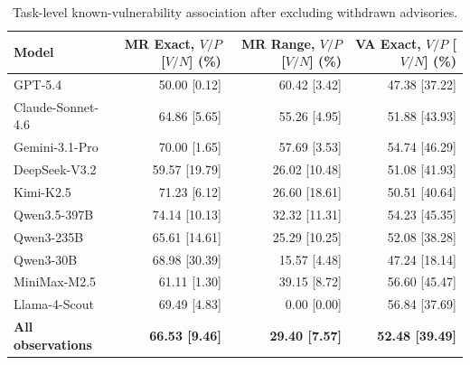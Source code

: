 \begin{table}[t]
\small
\centering
\caption{Task-level known-vulnerability association after excluding withdrawn advisories.}
\label{tab:rq2_cve_association}
\begin{tabular}{lrrr}
\toprule
Model & MR Exact, $V/P$ [$V/N$] (\%) & MR Range, $V/P$ [$V/N$] (\%) & VA Exact, $V/P$ [$V/N$] (\%) \\
\midrule
GPT-5.4 & 50.00 [0.12] & 60.42 [3.42] & 47.38 [37.22] \\
Claude-Sonnet-4.6 & 64.86 [5.65] & 55.26 [4.95] & 51.88 [43.93] \\
Gemini-3.1-Pro & 70.00 [1.65] & 57.69 [3.53] & 54.74 [46.29] \\
DeepSeek-V3.2 & 59.57 [19.79] & 26.02 [10.48] & 51.08 [41.93] \\
Kimi-K2.5 & 71.23 [6.12] & 26.60 [18.61] & 50.51 [40.64] \\
Qwen3.5-397B & 74.14 [10.13] & 32.32 [11.31] & 54.23 [45.35] \\
Qwen3-235B & 65.61 [14.61] & 25.29 [10.25] & 52.08 [38.28] \\
Qwen3-30B & 68.98 [30.39] & 15.57 [4.48] & 47.24 [18.14] \\
MiniMax-M2.5 & 61.11 [1.30] & 39.15 [8.72] & 56.60 [45.47] \\
Llama-4-Scout & 69.49 [4.83] & 0.00 [0.00] & 56.84 [37.69] \\
\midrule
\textbf{All observations} & \textbf{66.53 [9.46]} & \textbf{29.40 [7.57]} & \textbf{52.48 [39.49]} \\
\bottomrule
\end{tabular}
\end{table}
